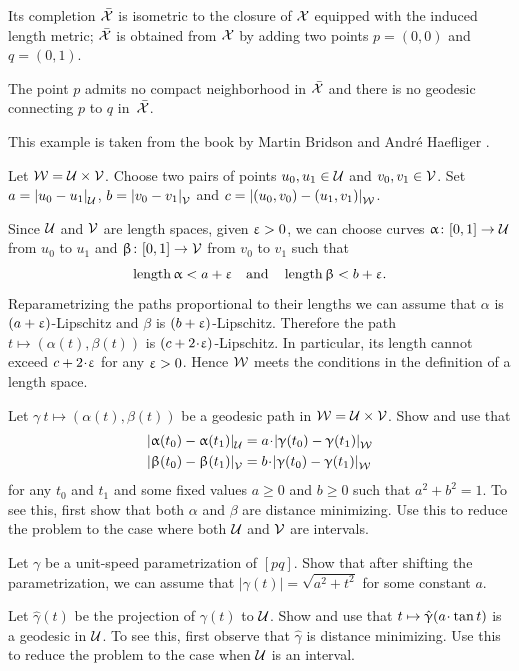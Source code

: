 Its completion $\bar{\mathcal{X}}$ is isometric to the closure of $\mathcal{X}$ equipped with the induced length metric;
$\bar{\mathcal{X}}$ is obtained from $\mathcal{X}$ by adding two points $p=(0,0)$ and $q=(0,1)$.

The point $p$ admits no compact neighborhood in $\bar{\mathcal{X}}$ 
and there is no geodesic connecting $p$ to $q$ in~$\bar{\mathcal{X}}$. 

This example is taken from the book by Martin Bridson and André Haefliger \cite[I.3.6(4)]{bridson-haefliger}.

Let $\spc{W}=\spc{U}\times \spc{V}$.
Choose two pairs of points $u_0,u_1\in \spc{U}$
and $v_0,v_1\in \spc{V}$.
Set $a=\dist{u_0}{u_1}{\spc{U}}$, $b=\dist{v_0}{v_1}{\spc{V}}$ and $c=\dist{(u_0,v_0)}{(u_1,v_1)}{\spc{W}}$.

Since $\mathcal{U}$ and $\mathcal{V}$ are length spaces,
given $\upvarepsilon>0$,
we can choose curves $\alpha\:[0,1]\to \spc{U}$ from $u_0$ to $u_1$
and $\beta\:[0,1]\to \spc{V}$ from $v_0$ to $v_1$
such that 
\[\mathop{\rm length}\nolimits \upalpha<a+\upvarepsilon
\quad\text{and}\quad
\mathop{\rm length}\nolimits \upbeta<b+\upvarepsilon.\]
Reparametrizing the paths proportional to their lengths we can assume that
$\alpha$ is $(a+\upvarepsilon)$-Lipschitz
and
$\beta$ is $(b+\upvarepsilon)$-Lipschitz.
Therefore the path $t\mapsto (\alpha(t),\beta(t))$ is $(c+2\cdot \eps)$-Lipschitz.
In particular, its length cannot exceed $c+2\cdot \eps$ for any $\upvarepsilon>0$.
Hence $\mathcal{W}$ meets the conditions in the definition of a length space.

Let $\gamma\:t\mapsto (\alpha(t),\beta(t))$ be a geodesic path in $\spc{W}=\spc{U}\times \spc{V}$.
Show and use that 
\begin{align*}
\dist{\alpha(t_0)}{\alpha(t_1)}{\spc{U}}
&=
a\cdot \dist{\gamma(t_0)}{\gamma(t_1)}{\spc{W}}
\\
\dist{\beta(t_0)}{\beta(t_1)}{\spc{V}}
&=
b\cdot \dist{\gamma(t_0)}{\gamma(t_1)}{\spc{W}}
\end{align*}
for any $t_0$ and $t_1$ and some fixed values $a\ge 0$ and $b\ge 0$ such that $a^2+b^2=1$.
To see this, first show that both $\alpha$ and $\beta$ are distance minimizing. Use this to reduce the problem to the case where both $\mathcal{U}$ and $\mathcal{V}$ are intervals.


Let $\gamma$ be a unit-speed parametrization of $[pq]$.
Show that after shifting the parametrization, we can assume that $|\gamma(t)|=\sqrt{a^2+t^2}$ for some constant $a$.

Let $\hat \gamma(t)$ be the projection of $\gamma(t)$ to $\mathcal{U}$.
Show and use that $t\z\mapsto \hat\gamma(a\cdot \tan t)$ is a geodesic in $\mathcal{U}$.
To see this, first observe that $\hat \gamma$ is distance minimizing. Use this to reduce the problem to the case when $\mathcal{U}$ is an interval.

